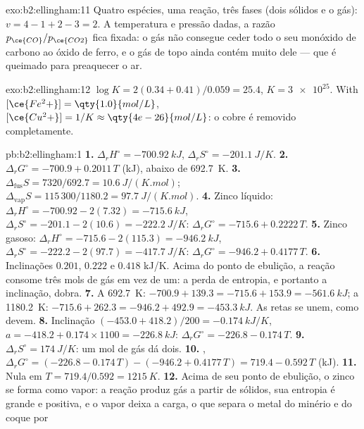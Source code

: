 \begin{solution}{exo:b2:ellingham:11}
Quatro espécies, uma reação, três fases (dois sólidos e o gás): $v = 4 - 1 +
2 - 3 = 2$. A temperatura e pressão dadas, a razão $p_{\ce{CO}}/p_{\ce{CO2}}$
fica fixada: o gás não consegue ceder todo o seu monóxido de carbono ao óxido
de ferro, e o gás de topo ainda contém muito dele --- que é queimado para
preaquecer o ar.
\end{solution}

\begin{solution}{exo:b2:ellingham:12}
$\log K = 2(0.34 + 0.41)/0.059 = 25.4$, $K = \num{3e25}$. With
$[\ce{Fe^2+}] = \qty{1.0}{mol/L}$, $[\ce{Cu^2+}] = 1/K \approx
\qty{4e-26}{mol/L}$: o cobre é removido completamente.
\end{solution}

\begin{solution}{pb:b2:ellingham:1}
\textbf{1.} $\Delta_r H^\circ = \qty{-700.92}{kJ}$, $\Delta_r S^\circ =
\qty{-201.1}{J/K}$.
\textbf{2.} $\Delta_r G^\circ = -700.9 + 0.2011\,T$ (\unit{kJ}), abaixo de
\qty{692.7}{K}.
\textbf{3.} $\Delta_{\text{fus}}S = 7320/692.7 = \qty{10.6}{J/(K.mol)}$;
$\Delta_{\text{vap}}S = 115\,300/1180.2 = \qty{97.7}{J/(K.mol)}$.
\textbf{4.} Zinco líquido: $\Delta_r H^\circ = -700.92 - 2(7.32) = \qty{-715.6}{kJ}$,
$\Delta_r S^\circ = -201.1 - 2(10.6) = \qty{-222.2}{J/K}$: $\Delta_r G^\circ =
-715.6 + 0.2222\,T$.
\textbf{5.} Zinco gasoso: $\Delta_r H^\circ = -715.6 - 2(115.3) = \qty{-946.2}{kJ}$,
$\Delta_r S^\circ = -222.2 - 2(97.7) = \qty{-417.7}{J/K}$: $\Delta_r G^\circ =
-946.2 + 0.4177\,T$.
\textbf{6.} Inclinações $0.201$, $0.222$ e $0.418$ \unit{kJ/K}. Acima do ponto
de ebulição, a reação consome três mols de gás em vez de um: a perda de
entropia, e portanto a inclinação, dobra.
\textbf{7.} A \qty{692.7}{K}: $-700.9 + 139.3 = -715.6 + 153.9 = \qty{-561.6}{kJ}$;
a \qty{1180.2}{K}: $-715.6 + 262.3 = -946.2 + 492.9 = \qty{-453.3}{kJ}$. As
retas se unem, como devem.
\textbf{8.} Inclinação $(-453.0 + 418.2)/200 = \qty{-0.174}{kJ/K}$, $a = -418.2 +
0.174 \times 1100 = \qty{-226.8}{kJ}$: $\Delta_r G^\circ = -226.8 - 0.174\,T$.
\textbf{9.} $\Delta_r S^\circ = \qty{+174}{J/K}$: um mol de gás dá dois.
\textbf{10.} , $\Delta_r G^\circ = (-226.8 - 0.174\,T)
- (-946.2 + 0.4177\,T) = 719.4 - 0.592\,T$ (\unit{kJ}).
\textbf{11.} Nula em $T = 719.4/0.592 = \qty{1215}{K}$.
\textbf{12.} Acima de seu ponto de ebulição, o zinco se forma como vapor: a
reação produz gás a partir de sólidos, sua entropia é grande e positiva, e o
vapor deixa a carga, o que separa o metal do minério e do coque por

\end{solution}
